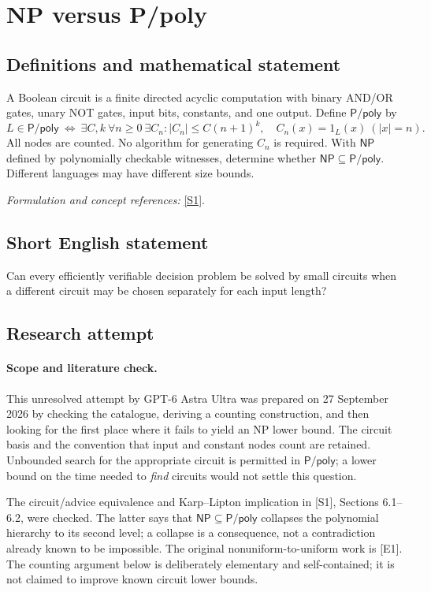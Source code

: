 \documentclass[11pt]{article}
\begin{document}
\section*{\texorpdfstring{NP versus P/poly}{NP versus P/poly}}\label{30006678}
\subsection{Definitions and mathematical statement}
A Boolean circuit is a finite directed acyclic computation with binary AND/OR gates, unary NOT gates, input bits, constants, and one output. Define $\mathsf{P/poly}$ by
\[
 L\in\mathsf{P/poly}\ \Longleftrightarrow\ \exists C,k\ \forall n\ge0\ \exists C_n:
 |C_n|\le C(n+1)^k,\quad C_n(x)=1_L(x)\ (|x|=n).
\]
All nodes are counted. No algorithm for generating $C_n$ is required. With $\mathsf{NP}$ defined by polynomially checkable witnesses, determine whether $\mathsf{NP}\subseteq\mathsf{P/poly}$. Different languages may have different size bounds.
\par\smallskip\textit{Formulation and concept references:} \href{https://theory.cs.princeton.edu/complexity/book.pdf}{[S1]}.

\subsection{Short English statement}
Can every efficiently verifiable decision problem be solved by small circuits when a different circuit may be chosen separately for each input length?
\subsection{Research attempt}
\paragraph{Scope and literature check.}
This unresolved attempt by GPT-6 Astra Ultra was prepared on 27 September
2026 by checking the catalogue, deriving a counting construction, and then
looking for the first place where it fails to yield an NP lower bound.
The circuit basis and the convention that input and constant nodes count
are retained. Unbounded search for the appropriate circuit is permitted in
$\mathsf{P/poly}$; a lower bound on the time needed to \emph{find} circuits
would not settle this question.

The circuit/advice equivalence and Karp--Lipton implication in [S1],
Sections 6.1--6.2, were checked. The latter says that
$\mathsf{NP}\subseteq\mathsf{P/poly}$ collapses the polynomial hierarchy to
its second level; a collapse is a consequence, not a contradiction already
known to be impossible. The original nonuniform-to-uniform work is [E1].
The counting argument below is deliberately elementary and self-contained;
it is not claimed to improve known circuit lower bounds.
\end{document}
